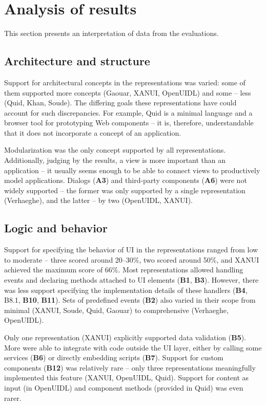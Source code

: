 \section{Analysis of results}\label{sec:analysis-of-results}
This section presents an interpretation of data from the evaluations.

\subsection{Architecture and structure}\label{subsec:4-2-architecture-and-structure}
Support for architectural concepts in the representations was varied: some of them supported more concepts (Gaouar, XANUI, OpenUIDL) and some -- less (Quid, Khan, Soude).
The differing goals these representations have could account for such discrepancies.
For example, Quid is a minimal language and a browser tool for prototyping Web components -- it is, therefore, understandable that it does not incorporate a concept of an application.

Modularization was the only concept supported by all representations.
Additionally, judging by the results, a view is more important than an application -- it usually seems enough to be able to connect views to productively model applications.
Dialogs (\textbf{A3}) and third-party components (\textbf{A6}) were not widely supported -- the former was only supported by a single representation (Verhaeghe), and the latter -- by two (OpenUIDL, XANUI).

\subsection{Logic and behavior}\label{subsec:4-2-logic-and-behavior}
Support for specifying the behavior of UI in the representations ranged from low to moderate -- three scored around 20--30\%, two scored around 50\%, and XANUI achieved the maximum score of 66\%.
Most representations allowed handling events and declaring methods attached to UI elements (\textbf{B1}, \textbf{B3}).
However, there was less support specifying the implementation details of these handlers (\textbf{B4}, B8.1, \textbf{B10}, \textbf{B11}).
Sets of predefined events (\textbf{B2}) also varied in their scope from minimal (XANUI, Soude, Quid, Gaouar) to comprehensive (Verhaeghe, OpenUIDL).

Only one representation (XANUI) explicitly supported data validation (\textbf{B5}).
More were able to integrate with code outside the UI layer, either by calling some services (\textbf{B6}) or directly embedding scripts (\textbf{B7}).
Support for custom components (\textbf{B12}) was relatively rare -- only three representations meaningfully implemented this feature (XANUI, OpenUIDL, Quid).
Support for content as input (in OpenUIDL) and component methods (provided in Quid) was even rarer.

